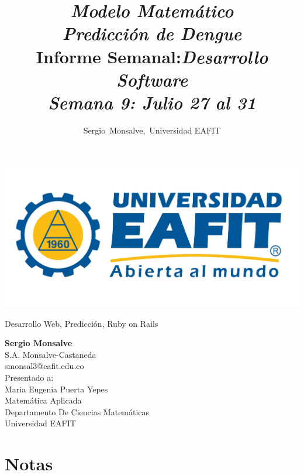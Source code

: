 \documentclass[12pt,journal,compsoc, onecolumn]{aux/IEEEtran}
\author{Sergio~Monsalve,~Universidad EAFIT}
\title{ \textbf{\textit{Modelo Matemático\\ Predicción de Dengue}}\\
Informe Semanal:\em{Desarrollo Software}\\
Semana 9: Julio 27 al 31 \\
}
\begin{document}
\pagestyle{fancyplain}
\fancyhf{}
\headheight=30pt %
\renewcommand{\headrulewidth}{0pt} %

\lhead %
{
\begin{minipage}{2cm}
\includegraphics[width=1.5 in]{aux/Logo_EAFIT.jpg}
\end{minipage}
}

\fancyfoot[c]{\thepage}

\maketitle

\begin{IEEEkeywords}
Desarrollo Web, Predicción, Ruby on Rails
\end{IEEEkeywords}

 
 \newpage
 \newpage
 \newpage

\begin{center}
\begin{IEEEbiographynophoto}{}
\textbf{Sergio Monsalve}\\
S.A. Monsalve-Castaneda \\
smonsal3@eafit.edu.co\\

Presentado a:\\
Maria Eugenia Puerta Yepes\\[0.2cm]
Matemática Aplicada\\
Departamento De Ciencias Matemáticas\\
Universidad EAFIT
\end{IEEEbiographynophoto}
\end{center}





\appendix
\chapter{Notas}

\end{document}
